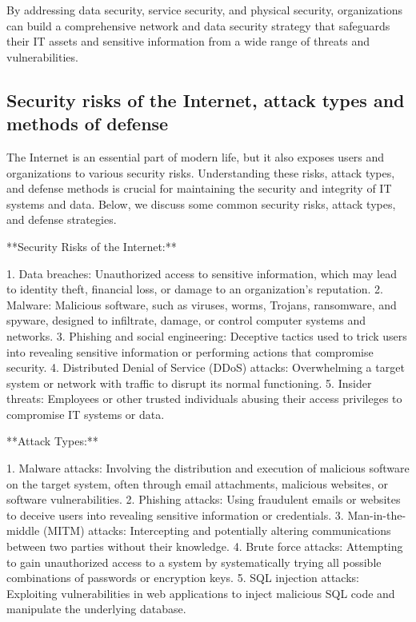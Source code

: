 \documentclass{article}
\begin{document}
By addressing data security, service security, and physical security, organizations can build a comprehensive network and data security strategy that safeguards their IT assets and sensitive information from a wide range of threats and vulnerabilities.


\subsection{Security risks of the Internet, attack types and methods of defense}

The Internet is an essential part of modern life, but it also exposes users and organizations to various security risks. Understanding these risks, attack types, and defense methods is crucial for maintaining the security and integrity of IT systems and data. Below, we discuss some common security risks, attack types, and defense strategies.

**Security Risks of the Internet:**

1. Data breaches: Unauthorized access to sensitive information, which may lead to identity theft, financial loss, or damage to an organization's reputation.
2. Malware: Malicious software, such as viruses, worms, Trojans, ransomware, and spyware, designed to infiltrate, damage, or control computer systems and networks.
3. Phishing and social engineering: Deceptive tactics used to trick users into revealing sensitive information or performing actions that compromise security.
4. Distributed Denial of Service (DDoS) attacks: Overwhelming a target system or network with traffic to disrupt its normal functioning.
5. Insider threats: Employees or other trusted individuals abusing their access privileges to compromise IT systems or data.

**Attack Types:**

1. Malware attacks: Involving the distribution and execution of malicious software on the target system, often through email attachments, malicious websites, or software vulnerabilities.
2. Phishing attacks: Using fraudulent emails or websites to deceive users into revealing sensitive information or credentials.
3. Man-in-the-middle (MITM) attacks: Intercepting and potentially altering communications between two parties without their knowledge.
4. Brute force attacks: Attempting to gain unauthorized access to a system by systematically trying all possible combinations of passwords or encryption keys.
5. SQL injection attacks: Exploiting vulnerabilities in web applications to inject malicious SQL code and manipulate the underlying database.
\end{document}
